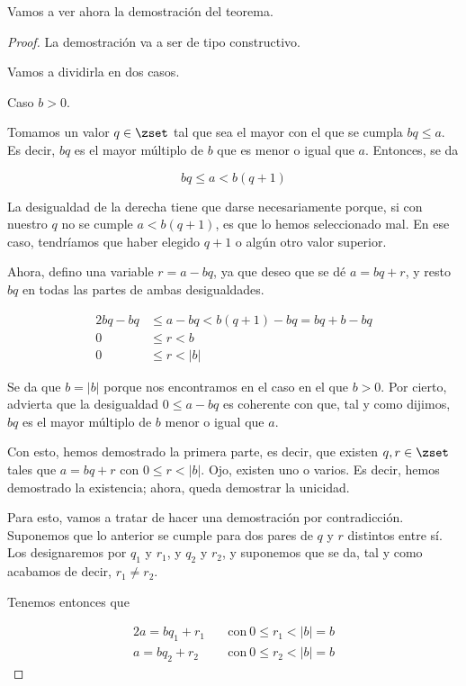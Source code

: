 Vamos a ver ahora la demostración del teorema.

\begin{proof}
  La demostración va a ser de tipo constructivo.

  Vamos a dividirla en dos casos.

  Caso $b > 0$.

  Tomamos un valor $q \in \zset$ tal que sea el mayor con el que se cumpla
  $bq \leq a$. Es decir, $bq$ es el mayor múltiplo de $b$ que es menor o
  igual que $a$. Entonces, se da

  $$ bq \leq a < b(q+1) $$

  \noindent La desigualdad de la derecha tiene que darse necesariamente
  porque, si con nuestro $q$ no se cumple $a < b(q+1)$, es que lo hemos
  seleccionado mal. En ese caso, tendríamos que haber elegido $q+1$ o algún
  otro valor superior.

  Ahora, defino una variable $r = a - bq$, ya que deseo que se dé $a = bq +
  r$, y resto $bq$ en todas las partes de ambas desigualdades.

  \begin{alignat*}{2}
    bq - bq   &\leq a - bq   < b(q+1) - bq = bq + b - bq \\
    0         &\leq r        < b \\
    0         &\leq r        < |b|
  \end{alignat*}

  \noindent Se da que $b = |b|$ porque nos encontramos en el caso en el que
  $b > 0$. Por cierto, advierta que la desigualdad $0 \leq a - bq$ es
  coherente con que, tal y como dijimos, $bq$ es el mayor múltiplo de $b$
  menor o igual que $a$.

  Con esto, hemos demostrado la primera parte, es decir, que existen $q, r
  \in \zset$ tales que $a = bq + r$ con $0 \leq r < |b|$. Ojo, existen uno o
  varios. Es decir, hemos demostrado la existencia; ahora, queda demostrar
  la unicidad.

  Para esto, vamos a tratar de hacer una demostración por contradicción.
  Suponemos que lo anterior se cumple para dos pares de $q$ y $r$ distintos
  entre sí. Los designaremos por $q_1$ y $r_1$, y $q_2$ y $r_2$, y suponemos
  que se da, tal y como acabamos de decir, $r_1 \neq r_2$.

  Tenemos entonces que

  \begin{alignat*}{2}
    a = bq_1 + r_1  & \quad \text{con} \ 0 \leq r_1 < |b| = b \\
    a = bq_2 + r_2  & \quad \text{con} \ 0 \leq r_2 < |b| = b
  \end{alignat*}


\end{proof}
